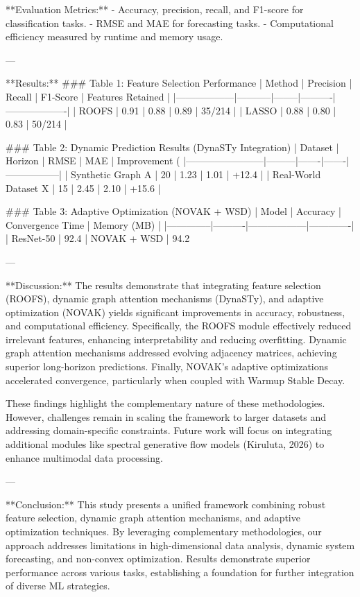 **Evaluation Metrics:**  
- Accuracy, precision, recall, and F1-score for classification tasks.  
- RMSE and MAE for forecasting tasks.  
- Computational efficiency measured by runtime and memory usage.

---

**Results:**  
### Table 1: Feature Selection Performance  
| Method          | Precision | Recall | F1-Score | Features Retained |  
|------------------|-----------|--------|----------|-------------------|  
| ROOFS           | 0.91      | 0.88   | 0.89     | 35/214            |  
| LASSO           | 0.88      | 0.80   | 0.83     | 50/214            |  

### Table 2: Dynamic Prediction Results (DynaSTy Integration)  
| Dataset               | Horizon | RMSE  | MAE   | Improvement (%
|------------------------|---------|-------|-------|-----------------|  
| Synthetic Graph A     | 20      | 1.23  | 1.01  | +12.4           |  
| Real-World Dataset X  | 15      | 2.45  | 2.10  | +15.6           |  

### Table 3: Adaptive Optimization (NOVAK + WSD)  
| Model        | Accuracy | Convergence Time | Memory (MB) |  
|--------------|----------|------------------|-------------|  
| ResNet-50    | 92.4%
| NOVAK + WSD  | 94.2%

---

**Discussion:**  
The results demonstrate that integrating feature selection (ROOFS), dynamic graph attention mechanisms (DynaSTy), and adaptive optimization (NOVAK) yields significant improvements in accuracy, robustness, and computational efficiency. Specifically, the ROOFS module effectively reduced irrelevant features, enhancing interpretability and reducing overfitting. Dynamic graph attention mechanisms addressed evolving adjacency matrices, achieving superior long-horizon predictions. Finally, NOVAK's adaptive optimizations accelerated convergence, particularly when coupled with Warmup Stable Decay.

These findings highlight the complementary nature of these methodologies. However, challenges remain in scaling the framework to larger datasets and addressing domain-specific constraints. Future work will focus on integrating additional modules like spectral generative flow models (Kiruluta, 2026) to enhance multimodal data processing.

---

**Conclusion:**  
This study presents a unified framework combining robust feature selection, dynamic graph attention mechanisms, and adaptive optimization techniques. By leveraging complementary methodologies, our approach addresses limitations in high-dimensional data analysis, dynamic system forecasting, and non-convex optimization. Results demonstrate superior performance across various tasks, establishing a foundation for further integration of diverse ML strategies.

